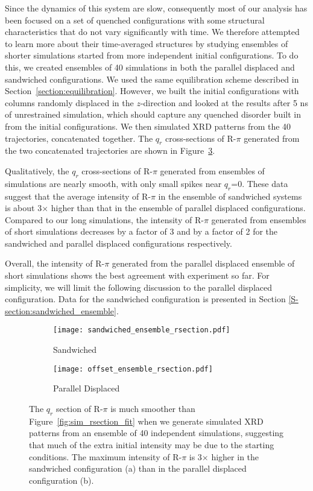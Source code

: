   Since the dynamics of this system are slow, consequently most of our analysis
  has been focused on a set of quenched configurations with some structural
  characteristics that do not vary significantly with time. We therefore
  attempted to learn more about their time-averaged structures by studying
  ensembles of shorter simulations started from more independent initial
  configurations. To do this, we created ensembles of 40 simulations in both the
  parallel displaced and sandwiched configurations. We used the same
  equilibration scheme described in Section~\ref{section:equilibration}.
  However, we built the initial configurations with columns randomly displaced in
  the $z$-direction and looked at the results after 5 ns of unrestrained
  simulation, which should capture any quenched disorder built in from the
  initial configurations. We then simulated XRD patterns from the 40
  trajectories, concatenated together. The $q_r$ cross-sections of R-$\pi$
  generated from the two concatenated trajectories are shown in
  Figure~\ref{fig:ensemble_XRD}. 
  
  Qualitatively, the $q_r$ cross-sections of R-$\pi$ generated from ensembles of
  simulations are nearly smooth, with only small spikes near $q_r$=0. These data
  suggest that the average intensity of R-$\pi$ in the ensemble of sandwiched 
  systems is about 3$\times$ higher than that in the ensemble of parallel displaced
  configurations. Compared to our long simulations, the intensity of R-$\pi$
  generated from ensembles of short simulations decreases by a factor of 3
  and by a factor of 2 for the sandwiched and parallel displaced configurations respectively. 

  Overall, the intensity of R-$\pi$ generated from the parallel displaced 
  ensemble of short simulations shows the best agreement with experiment so far. For simplicity, 
  we will limit the following discussion to the parallel displaced configuration.
  Data for the sandwiched configuration is presented in Section 
  \ref{S-section:sandwiched_ensemble}.

  \begin{figure}[!htb]
  \centering
  \begin{subfigure}{0.45\textwidth}
  \texttt{[image: sandwiched\_ensemble\_rsection.pdf]}
  \caption{Sandwiched}\label{fig:sandwiched_ensemble_rsection}
  \end{subfigure}
  \begin{subfigure}{0.45\textwidth}
  \texttt{[image: offset\_ensemble\_rsection.pdf]}
  \caption{Parallel Displaced}\label{fig:offset_ensemble_rsection}
  \end{subfigure}
  \caption{The $q_r$ section of R-$\pi$ is much smoother than Figure~\ref{fig:sim_rsection_fit} when
  		   we generate simulated XRD patterns from an ensemble of 40 independent simulations,
  		   suggesting that much of the extra initial intensity may be due to the starting 
  		   conditions. The maximum intensity of R-$\pi$ is 3$\times$ higher in the sandwiched
  		   configuration (a) than in the parallel displaced configuration (b).}\label{fig:ensemble_XRD}
  \end{figure}
 
